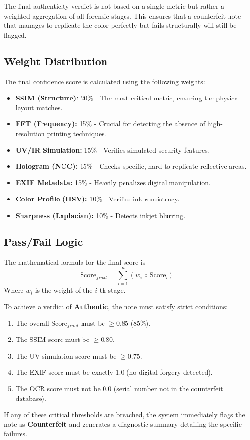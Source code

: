 \documentclass[12pt,a4paper]{article}
\begin{document}
The final authenticity verdict is not based on a single metric but rather a weighted aggregation of all forensic stages. This ensures that a counterfeit note that manages to replicate the color perfectly but fails structurally will still be flagged.

\subsection{Weight Distribution}
The final confidence score is calculated using the following weights:
\begin{itemize}
    \item \textbf{SSIM (Structure):} 20\% - The most critical metric, ensuring the physical layout matches.
    \item \textbf{FFT (Frequency):} 15\% - Crucial for detecting the absence of high-resolution printing techniques.
    \item \textbf{UV/IR Simulation:} 15\% - Verifies simulated security features.
    \item \textbf{Hologram (NCC):} 15\% - Checks specific, hard-to-replicate reflective areas.
    \item \textbf{EXIF Metadata:} 15\% - Heavily penalizes digital manipulation.
    \item \textbf{Color Profile (HSV):} 10\% - Verifies ink consistency.
    \item \textbf{Sharpness (Laplacian):} 10\% - Detects inkjet blurring.
\end{itemize}

\subsection{Pass/Fail Logic}
The mathematical formula for the final score is:
\begin{equation}
\text{Score}_{final} = \sum_{i=1}^{n} (w_i \times \text{Score}_i)
\end{equation}
Where $w_i$ is the weight of the $i$-th stage. 

To achieve a verdict of \textbf{Authentic}, the note must satisfy strict conditions:
\begin{enumerate}
    \item The overall $\text{Score}_{final}$ must be $\ge 0.85$ (85\%).
    \item The SSIM score must be $\ge 0.80$.
    \item The UV simulation score must be $\ge 0.75$.
    \item The EXIF score must be exactly $1.0$ (no digital forgery detected).
    \item The OCR score must not be $0.0$ (serial number not in the counterfeit database).
\end{enumerate}
If any of these critical thresholds are breached, the system immediately flags the note as \textbf{Counterfeit} and generates a diagnostic summary detailing the specific failures.
\end{document}
